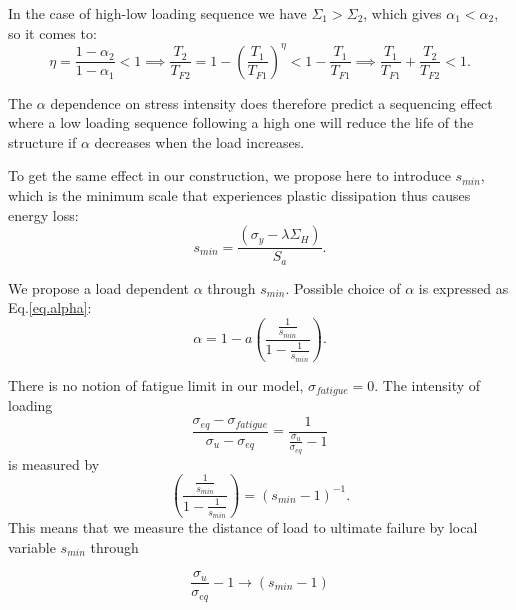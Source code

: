 In the case of high-low loading sequence we have $\Sigma_1>\Sigma_2$,  which gives $\alpha_1<\alpha_2$, so it comes to:
$$\eta=\frac{1-\alpha_2}{1-\alpha_1}<1 \implies
\frac{T_2}{T_{F2}}=1-\left( \frac{T_1}{T_{F1}}\right) ^\eta<1-\frac{T_1}{T_{F1}} \implies
\frac{T_1}{T_{F1}}+\frac{T_2}{T_{F2}}<1.$$

The $\alpha$ dependence on stress intensity does therefore predict a sequencing effect where a low loading sequence following a high one will reduce the life of the structure if $\alpha$ decreases when the load increases.

To get the same effect in our construction, we propose here to introduce $s_{min}$, which is the minimum scale that experiences plastic dissipation thus causes energy loss:
\begin{equation}
s_{min}=\dfrac{\left(\sigma_y-\lambda \Sigma_H\right)}{S_{a}}.
\label{eq.smin}
\end{equation}

We propose a load dependent $\alpha$ through $s_{min}$. Possible choice
of $\alpha$ is expressed as Eq.\eqref{eq.alpha}:
\begin{equation}
\alpha=1-a\left( \dfrac{\frac{1}{s_{min}}}{1-\frac{1}{s_{min}}} \right) .
\label{eq.alpha}
\end{equation}

There is no notion of fatigue limit in our model, $\sigma_{fatigue}=0$. The intensity of loading
$$\frac{ \sigma_{eq}-\sigma_{fatigue}}{ \sigma_{u} - \sigma_{eq}}= \frac{ 1}{\frac{\sigma_{u}}{\sigma_{eq}} -1}$$
is measured by 
$$\left( \dfrac{\frac{1}{s_{min}}}{1-\frac{1}{s_{min}}}\right) =\left(s_{min}-1 \right) ^{-1}.$$
This means that we measure the distance of load to ultimate failure by local variable $s_{min}$ through 

$$\frac{\sigma_{u}}{\sigma_{eq}} -1 \longrightarrow \left( s_{min}-1\right)  $$


